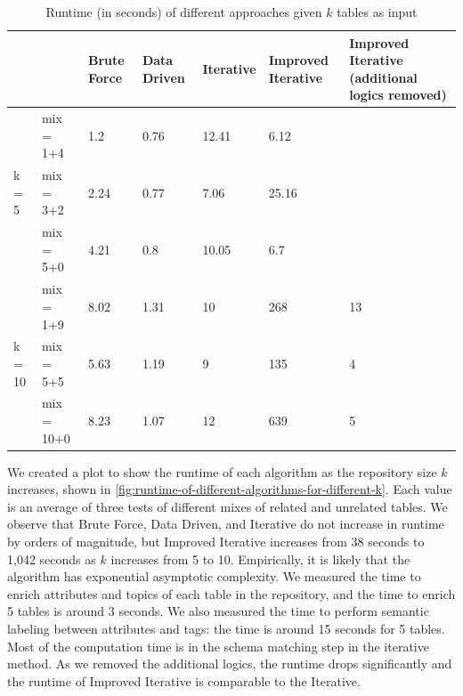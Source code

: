 \begin{table}[ht!]
    \centering
    \scriptsize
    \begin{center}
      \caption{Runtime (in seconds) of different approaches given $k$ tables as input}
      \label{tab:Runtime-of-different-approaches-given-k-tables-as-input}
      \begin{tabular}{|p{}|p{}|p{}|p{}|p{}|p{}|p{}|}  
        \hline
         & & \textbf{Brute Force} & \textbf{Data Driven} & \textbf{Iterative} & \textbf{Improved Iterative} & \textbf{Improved Iterative (additional logics removed)}\\
        \hline
        \multirow{3}{*}{k = 5} & mix = 1+4 & 1.2 & 0.76 & 12.41 & 6.12 & \\
        \cline{2-7}
        & mix = 3+2 & 2.24 & 0.77 & 7.06 & 25.16 & \\
        \cline{2-7}
        & mix = 5+0 & 4.21 & 0.8 & 10.05 & 6.7 & \\
        \hline        
        \multirow{3}{*}{k = 10} & mix = 1+9 & 8.02 & 1.31 & 10 & 268 & 13 \\
        \cline{2-7}
        & mix = 5+5 & 5.63 & 1.19 & 9 & 135 & 4 \\
        \cline{2-7}
        & mix = 10+0 & 8.23 & 1.07 & 12 & 639 & 5 \\
        \hline
      \end{tabular}
    \end{center}
\end{table}

We created a plot to show the runtime of each algorithm as the repository size $k$ increases, shown in \autoref{fig:runtime-of-different-algorithms-for-different-k}. Each value is an average of three tests of different mixes of related and unrelated tables. We observe that Brute Force, Data Driven, and Iterative do not increase in runtime by orders of magnitude, but Improved Iterative increases from 38 seconds to 1,042 seconds as $k$ increases from 5 to 10. Empirically, it is likely that the algorithm has exponential asymptotic complexity. We measured the time to enrich attributes and topics of each table in the repository, and the time to enrich 5 tables is around 3 seconds. We also measured the time to perform semantic labeling between attributes and tags: the time is around 15 seconds for 5 tables. Most of the computation time is in the schema matching step in the iterative method. As we removed the additional logics, the runtime drops significantly and the runtime of Improved Iterative is comparable to the Iterative.

